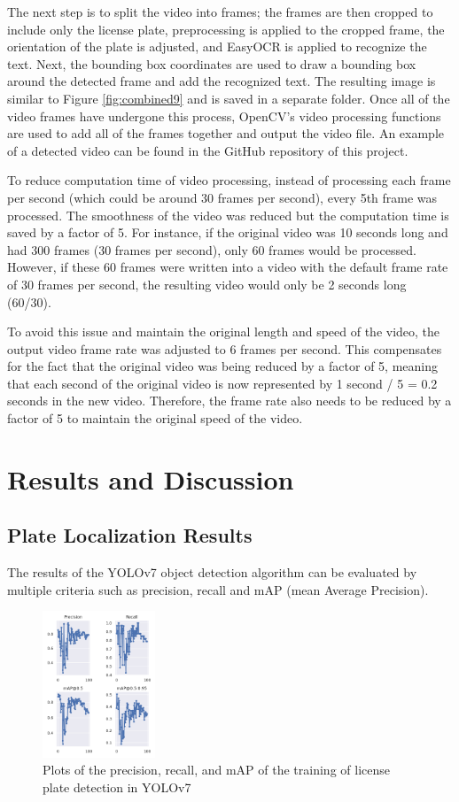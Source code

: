 \documentclass[conference]{IEEEtran}
\begin{document}
The next step is to split the video into frames; the frames are then cropped to include only the license plate, preprocessing is applied to the cropped frame, the orientation of the plate is adjusted, and EasyOCR is applied to recognize the text. Next, the bounding box coordinates are used to draw a bounding box around the detected frame and add the recognized text. The resulting image is similar to Figure \ref{fig:combined9} and is saved in a separate folder. Once all of the video frames have undergone this process, OpenCV's video processing functions are used to add all of the frames together and output the video file. An example of a detected video can be found in the GitHub repository of this project. 


To reduce computation time of video processing, instead of processing each frame per second (which could be around 30 frames per second), every 5th frame was processed. The smoothness of the video was reduced but the computation time is saved by a factor of 5. 
For instance, if the original video was 10 seconds long and had 300 frames (30 frames per second), only 60 frames would be processed. However, if these 60 frames were written into a video with the default frame rate of 30 frames per second, the resulting video would only be 2 seconds long (60/30).

To avoid this issue and maintain the original length and speed of the video, the output video frame rate was adjusted to 6 frames per second. This compensates for the fact that the original video was being reduced by a factor of 5, meaning that each second of the original video is now represented by 1 second / 5 = 0.2 seconds in the new video. Therefore, the frame rate also needs to be reduced by a factor of 5 to maintain the original speed of the video.

\section{Results and Discussion}
\subsection{Plate Localization Results}

The results of the YOLOv7 object detection algorithm can be evaluated by multiple criteria such as precision, recall and mAP (mean Average Precision). 

\begin{figure}[h]
    \centering
    \includegraphics[width=0.3\textwidth]{images/Picture32.png}
    \caption{Plots of the precision, recall, and mAP of the training  of license plate detection in YOLOv7 }
    \label{fig:Picture32}
\end{figure}
\end{document}
